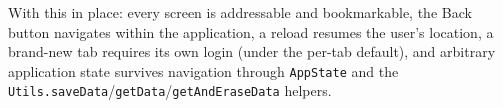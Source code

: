 \noindent
With this in place: every screen is addressable and bookmarkable, the Back button navigates within the application, a reload resumes the user's location, a brand-new tab requires its own login (under the per-tab default), and arbitrary application state survives navigation through \texttt{AppState} and the \texttt{Utils.saveData}/\texttt{getData}/\texttt{getAndEraseData} helpers.
